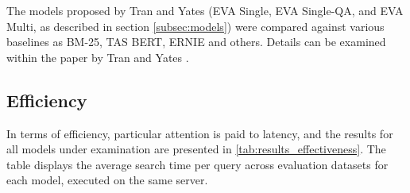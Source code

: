 The models proposed by Tran and Yates (EVA Single, EVA Single-QA, and EVA Multi, as described in section \ref{subsec:models}) were compared against various baselines as BM-25, TAS BERT, ERNIE and others. Details can be examined within the paper by Tran and Yates \cite{tran2022dense}.

\subsection{Efficiency}\label{sec:efficiency}

In terms of efficiency, particular attention is paid to latency, and the results for all models under examination are presented in \autoref{tab:results_effectiveness}. The table displays the average search time per query across evaluation datasets for each model, executed on the same server.

